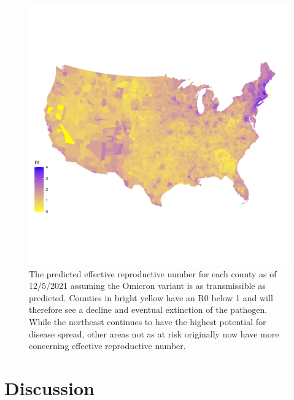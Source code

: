 \documentclass[
  12pt,
]{article}
\begin{document}
\begin{figure}[H]

{\centering \includegraphics{Final-Manuscript_files/figure-latex/fig6-1} 

}

\caption{The predicted effective reproductive number for each county as of 12/5/2021 assuming the Omicron variant is as transmissible as predicted. Counties in bright yellow have an R0 below 1 and will therefore see a decline and eventual extinction of the pathogen. While the northeast continues to have the highest potential for disease spread, other areas not as at risk originally now have more concerning effective reproductive number.}\label{fig:fig6}
\end{figure}

\hypertarget{discussion}{%
\section{Discussion}\label{discussion}}
\end{document}
